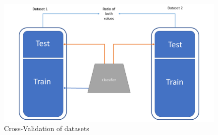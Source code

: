 \begin{figure}[tbph]
\centering
\caption{Cross-Validation of datasets}\label{fig:1} 
\includegraphics[scale=0.35]{figures/imagem1.pdf}
\end{figure}






